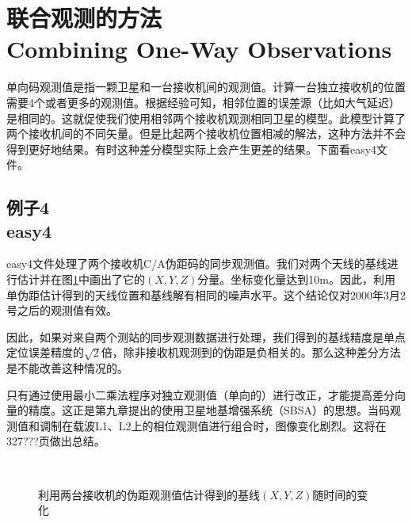 \section[联合观测的方法]{联合观测的方法\\Combining One-Way Observations}
单向码观测值是指一颗卫星和一台接收机间的观测值。计算一台独立接收机的位置需要4个或者更多的观测值。根据经验可知，相邻位置的误差源（比如大气延迟）是相同的。这就促使我们使用相邻两个接收机观测相同卫星的模型。此模型计算了两个接收机间的不同矢量。但是比起两个接收机位置相减的解法，这种方法并不会得到更好地结果。有时这种差分模型实际上会产生更差的结果。下面看easy4文件。

\subsection[例子4]{例子4\\easy4}
	easy4文件处理了两个接收机C/A伪距码的同步观测值。我们对两个天线的基线进行估计并在图\ref{fig:10-1}中画出了它的$(X,Y,Z)$分量。坐标变化量达到10m。因此，利用单伪距估计得到的天线位置和基线解有相同的噪声水平。这个结论仅对2000年3月2号之后的观测值有效。
	
	因此，如果对来自两个测站的同步观测数据进行处理，我们得到的基线精度是单点定位误差精度的$\sqrt{2}$倍，除非接收机观测到的伪距是负相关的。那么这种差分方法是不能改善这种情况的。
	
	只有通过使用最小二乘法程序对独立观测值（单向的）进行改正，才能提高差分向量的精度。这正是第九章提出的使用卫星地基增强系统（SBSA）的思想。当码观测值和调制在载波L1、L2上的相位观测值进行组合时，图像变化剧烈。这将在327???页做出总结。
	\begin{figure}
		\caption{ 利用两台接收机的伪距观测值估计得到的基线$(X,Y,Z)$随时间的变化}   \label{fig:10-1} 
	\end{figure}
	
